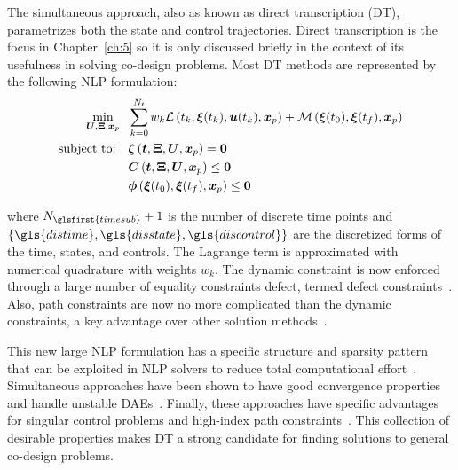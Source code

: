 The simultaneous approach, also as known as direct transcription (DT), parametrizes both the state and control trajectories. 
Direct transcription is the focus in Chapter~\ref{ch:5} so it is only discussed briefly in the context of its usefulness in solving co-design problems.
Most DT methods are represented by the following NLP formulation:
\begingroup
\allowdisplaybreaks
\begin{subequations}
\begin{align}
\hspace*{-0.05in} \min_{\bm{U},\bm{\Xi}, \bxp} \ \  & \sum_{k=0}^{N_t} w_k \lagrange \left( t_k, \bxi(t_k), \bu(t_k), \bxp \right) + \mayer \left( \bxi(t_0), \bxi(t_f), \bxp \right) \label{eq:ch3:dt_1} \\
\text{subject to:} \quad & \bm{\zeta}\left( \bm{t}, \bm{\Xi}, \bm{U}, \bxp \right) = \bzero \label{eq:ch3:dt_2} \\
& \bm{C} \left( \bm{t}, \bm{\Xi}, \bm{U}, \bxp \right) \leq \bzero \label{eq:ch3:dt_3} \\
& \bm{\phi} \left( \bxi(t_0), \bxi(t_f), \bxp \right) \leq \bzero \qquad \qquad \qquad \qquad \label{eq:ch3:dt_4}
\end{align}
\end{subequations}
\endgroup

\noindent where $N_{\glsfirst{timesub}}+1$ is the number of discrete time points and $\left\lbrace \gls{distime}, \gls{disstate}, \gls{discontrol} \right\rbrace$ are the discretized forms of the time, states, and controls. The Lagrange term is approximated with numerical quadrature with weights $w_k$. The dynamic constraint is now enforced through a large number of equality constraints \gls{defect}, termed defect constraints~\cite{Rao2010a, Betts2010a, Biegler2010a}. Also, path constraints are now no more complicated than the dynamic constraints, a key advantage over other solution methods~\cite{Biegler2010a, Herber2015a}.

This new large NLP formulation has a specific structure and sparsity pattern that can be exploited in NLP solvers to reduce total computational effort~\cite{Biegler2010a}. Simultaneous approaches have been shown to have good convergence properties and handle unstable DAEs~\cite{Biegler2007a, Garg2011a}. Finally, these approaches have specific advantages for singular control problems and high-index path constraints~\cite{Biegler2007a}. This collection of desirable properties makes DT a strong candidate for finding solutions to general co-design problems.

